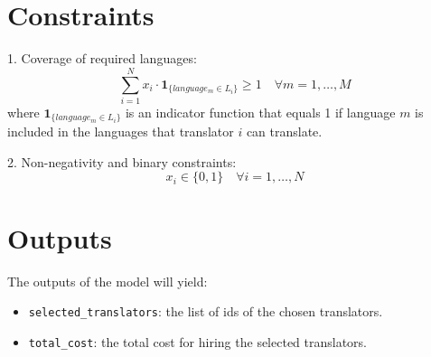\documentclass{article}
\begin{document}
\section*{Constraints}

1. Coverage of required languages:
\[
\sum_{i=1}^{N} x_i \cdot \mathbf{1}_{\{language_m \in L_i\}} \geq 1 \quad \forall m = 1, \ldots, M
\]
where \( \mathbf{1}_{\{language_m \in L_i\}} \) is an indicator function that equals 1 if language \( m \) is included in the languages that translator \( i \) can translate.

2. Non-negativity and binary constraints:
\[
x_i \in \{0, 1\} \quad \forall i = 1, \ldots, N
\]

\section*{Outputs}

The outputs of the model will yield:
\begin{itemize}
    \item \texttt{selected\_translators}: the list of ids of the chosen translators.
    \item \texttt{total\_cost}: the total cost for hiring the selected translators.
\end{itemize}
\end{document}
